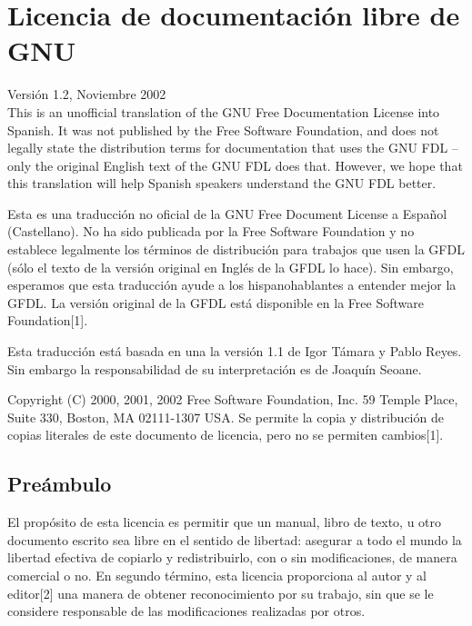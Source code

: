 
\chapter{Licencia de documentación libre de GNU}

Versión 1.2, Noviembre 2002 \\



This is an unofficial translation of the GNU Free Documentation
License into Spanish. It was not published by the Free Software
Foundation, and does not legally state the distribution terms for
documentation that uses the GNU FDL -- only the original English
text of the GNU FDL does that. However, we hope that this
translation will help Spanish speakers understand the GNU FDL
better.

Esta es una traducción no oficial de la GNU Free Document License a
Español (Castellano). No ha sido publicada por la Free Software
Foundation y no establece legalmente los términos de distribución
para trabajos que usen la GFDL (sólo el texto de la versión
original en Inglés de la GFDL lo hace). Sin embargo, esperamos que
esta traducción ayude a los hispanohablantes a entender mejor la
GFDL. La versión original de la GFDL está disponible en la Free
Software Foundation[1].

Esta traducción está basada en una la versión 1.1 de Igor Támara
y Pablo Reyes. Sin embargo la responsabilidad de su interpretación
es de Joaquín Seoane.

Copyright (C) 2000, 2001, 2002 Free Software Foundation, Inc. 59
Temple Place, Suite 330, Boston, MA 02111-1307 USA. Se permite la
copia y distribución de copias literales de este documento de
licencia, pero no se permiten cambios[1].


\section*{Preámbulo}

El propósito de esta licencia es permitir que un manual, libro de
texto, u otro documento escrito sea libre en el sentido de libertad:
asegurar a todo el mundo la libertad efectiva de copiarlo y
redistribuirlo, con o sin modificaciones, de manera comercial o no. En
segundo término, esta licencia proporciona al autor y al editor[2]
una manera de obtener reconocimiento por su trabajo, sin que se le
considere responsable de las modificaciones realizadas por otros.

